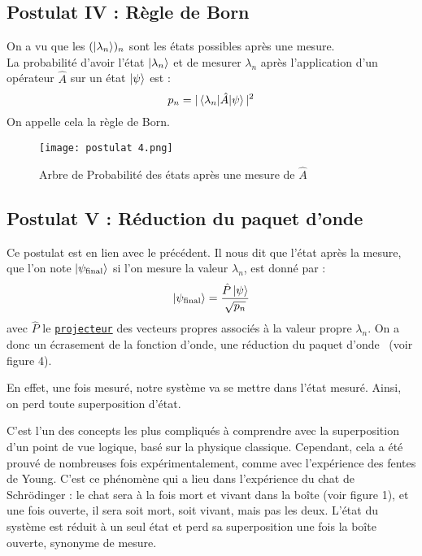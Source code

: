 \documentclass[11pt]{article}
\begin{document}
\subsection{Postulat IV : Règle de Born}

On a vu que les \( (\ket{\lambda_n})_n \) sont les états possibles après une mesure. \\
La probabilité d'avoir l'état \( \ket{\lambda_n} \) et de mesurer \( \lambda_n \) après l'application d'un opérateur \( \hat{A} \) sur un état \( \ket{\psi} \) est :
\[
p_n = |\braket{\lambda_n|\hat{A}|\psi}|^2
\]
On appelle cela la règle de Born.

\begin{figure}[h]
 \caption{Arbre de Probabilité des états après une mesure de \( \hat{A} \)~\cite{figure}}
 \vspace{0.5cm}
 \texttt{[image: postulat 4.png]}
 \centering
 \label{fig:probabilite}
\end{figure}


 \newpage 
 
\subsection{Postulat V : Réduction du paquet d'onde} \label{sec:PV}

Ce postulat est en lien avec le précédent. Il nous dit que l'état après la mesure, que l'on note \( \ket{\psi_{\text{final}}} \) si l'on mesure la valeur \( \lambda_n \), est donné par :
\[
\ket{\psi_{\text{final}}} = \frac{\hat{P} \ket{\psi}}{\sqrt{p_n}}
\]
avec \( \hat{P} \) le \hyperref[sec:Projecteur]{\texttt{projecteur}} des vecteurs propres associés à la valeur propre \( \lambda_n \).
On a donc un écrasement de la fonction d'onde, une réduction du paquet d'onde~\cite{wikRED} (voir figure 4).

\qquad En effet, une fois mesuré, notre système va se mettre dans l'état mesuré. Ainsi, on perd toute superposition d'état.

\qquad C'est l'un des concepts les plus compliqués à comprendre avec la superposition d'un point de vue logique, basé sur la physique classique. Cependant, cela a été prouvé de nombreuses fois expérimentalement, comme avec l'expérience des fentes de Young.
\qquad C'est ce phénomène qui a lieu dans l'expérience du chat de Schrödinger : le chat sera à la fois mort et vivant dans la boîte (voir figure 1), et une fois ouverte, il sera soit mort, soit vivant, mais pas les deux. L'état du système est réduit à un seul état et perd sa superposition une fois la boîte ouverte, synonyme de mesure.
\end{document}
